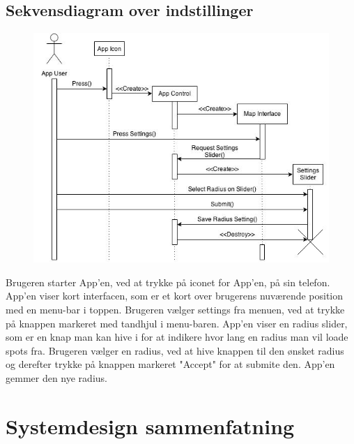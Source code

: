 \documentclass[12pt]{article}
\begin{document}
\subsection*{Sekvensdiagram over indstillinger}
\begin{figure}[h]
\includegraphics[scale = 0.5]{sekdia3}
\end{figure}

Brugeren starter App'en, ved at trykke på iconet for App'en, på sin telefon. App'en viser kort interfacen, 
som er et kort over brugerens nuværende position med en menu-bar i toppen. Brugeren vælger settings fra menuen, 
ved at trykke på knappen markeret med tandhjul i menu-baren. App'en viser en radius slider, som er en knap man kan hive i
for at indikere hvor lang en radius man vil loade spots fra. Brugeren vælger en radius, ved at hive knappen til den ønsket
radius og derefter trykke på knappen markeret "Accept" for at submite den. App'en gemmer den nye radius.

\pagebreak

\section{Systemdesign sammenfatning}
\end{document}
